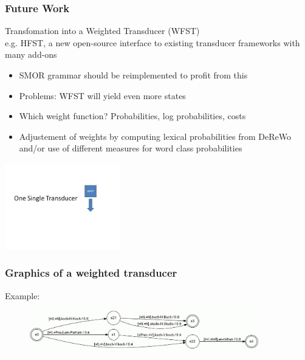\documentclass {beamer}
\begin{document}
\frame
{  \frametitle{Future Work}

Transfomation into a Weighted Transducer (WFST) \\
e.g. HFST, a new open-source interface to existing transducer frameworks with many add-ons  \\
\begin{itemize} 
\item SMOR grammar should be reimplemented to profit from this
\item Problems: WFST will yield even more states
\item Which weight function? Probabilities, log probabilities, costs
\item Adjustement of weights by computing lexical probabilities from DeReWo and/or use of different measures for word class probabilities
 \end{itemize}
 \includegraphics[width=5cm] {Single2.jpg}
}

\frame
{  \frametitle{Graphics of a weighted transducer}
Example:
\begin{figure}[hp]
	\centering
		\includegraphics[width=10cm]{graph13.jpg}
	\label{fig:graph13}
\end{figure}
}
\end{document}
